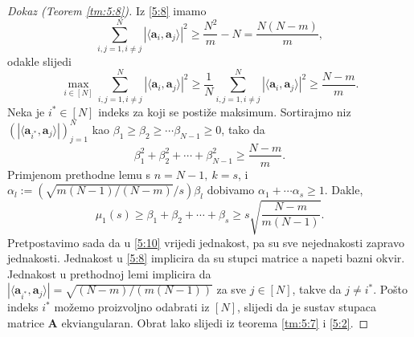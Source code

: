 \documentclass[a4paper,twoside,12pt]{memoir} %
\newcommand{\vect}[1]{\mathbf{#1}}
\renewcommand{\vec}{\vect}
\begin{document}
\begin{proof}[Dokaz (Teorem \ref{tm:5:8})]
    Iz \eqref{5:8} imamo 
    \begin{equation*}
        \sum_{i,j=1,i \neq j}^N |\langle \vec a_i, \vec a_j \rangle|^2 \geq \frac{N^2}{m} - N = \frac{N(N-m)}{m},
    \end{equation*}
    odakle slijedi
    \begin{equation*}
        \max_{i \in [N]} \sum_{i,j=1,i \neq j}^N |\langle \vec a_i, \vec a_j \rangle|^2 \geq \frac{1}{N} \sum_{i,j=1,i \neq j}^N |\langle \vec a_i, \vec a_j \rangle|^2 \geq \frac{N-m}{m} .
    \end{equation*}
    Neka je $i^* \in [N]$ indeks za koji se posti\v{z}e maksimum. Sortirajmo niz $(|\langle \vec a_{i^*}, \vec a_j \rangle|)_{j=1}^{N}$ kao $\beta_1 \geq \beta_2 \geq \cdots \beta_{N-1} \geq 0$, tako da
    \begin{equation*}
        \beta_1^2 + \beta_2^2 + \cdots + \beta_{N-1}^2 \geq \frac{N-m}{m} .
    \end{equation*}
    Primjenom prethodne lemu s $n = N-1,\ k = s$, i $\alpha_l := (\sqrt{m(N-1)/(N-m)}/s)\beta_l$ dobivamo $\alpha_1 + \cdots \alpha_s \geq 1$. Dakle,
    \begin{equation*}
        \mu_1(s) \geq \beta_1 + \beta_2 + \cdots + \beta_s \geq s \sqrt{\frac{N-m}{m(N-1)}}.
    \end{equation*}
    Pretpostavimo sada da u \eqref{5:10} vrijedi jednakost, pa su sve nejednakosti zapravo jednakosti. Jednakost u \eqref{5:8} implicira da su stupci matrice a napeti bazni okvir. Jednakost u prethodnoj lemi implicira da $|\langle \vec a_{i^*}, \vec a_j \rangle| = \sqrt{(N-m)/(m(N-1))}$ za sve $j \in [N]$, takve da $j \neq i^*$. Po\v{s}to indeks $i^*$ mo\v{z}emo proizvoljno odabrati iz $[N]$, slijedi da je sustav stupaca matrice $\vec A$ ekviangularan. Obrat lako slijedi iz teorema \ref{tm:5:7} i \eqref{5:2}.
\end{proof}




\pagestyle{empty} %


\begin{sazetak}
\end{sazetak}

\begin{summary}
\end{summary}


\begin{cv}
\end{cv}
\end{document}
